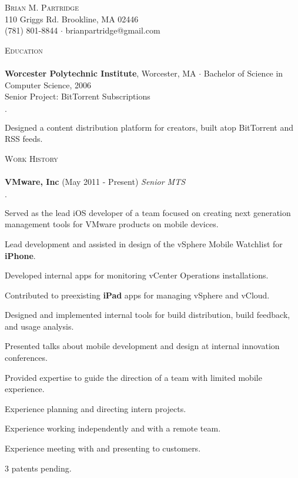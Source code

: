 \documentclass[11pt]{article}
\newcommand{\mydot}{$\cdot$ }
\newcommand{\lineunder}{\vspace*{-8pt} \\ \hspace*{-18pt} \hrulefill \\}
\newcommand{\header}[1]{{\hspace*{-15pt}\vspace*{6pt} \textsc{#1}} \vspace*{-6pt} \lineunder}
\newcommand{\contact}[3]{\vspace*{-8pt}\begin{center}{\LARGE \scshape {#1}}\\#2 \\ #3\end{center}\vspace*{-8pt}}
\newcommand{\school}[3]{\textbf{#1}{#2} \mydot #3 \\}
\newcommand{\seniorproject}[2]{Senior Project: #1\\ #2  }
\newcommand{\employer}[3]{\textbf{#1} (#2) \emph{#3}\\  }
\newenvironment{achievements}{\begin{list}{\mydot}{\topsep 0pt \itemsep -2pt}}{\vspace*{4pt}\end{list}}
\begin{document}
\small
\smallskip
\vspace*{-44pt}


\contact{Brian M. Partridge}
{110 Griggs Rd. Brookline, MA 02446}
{
(781) 801-8844
\mydot brianpartridge@gmail.com 
}


\header{Education}
\school{Worcester Polytechnic Institute}{, Worcester, MA}{Bachelor of Science in Computer Science, 2006}

\seniorproject{BitTorrent Subscriptions}{
\begin{achievements}
  \item Designed a content distribution platform for creators, built atop BitTorrent and RSS feeds.
\end{achievements}
}


\header{Work History}
\employer{VMware, Inc}{May 2011 - Present}{Senior MTS}
\begin{achievements}
  \item Served as the lead iOS developer of a team focused on creating next generation management tools for VMware products on mobile devices.
  \item Lead development and assisted in design of the vSphere Mobile Watchlist for \textbf{iPhone}.
  \item Developed internal apps for monitoring vCenter Operations installations.
  \item Contributed to preexisting \textbf{iPad} apps for managing vSphere and vCloud.
  \item Designed and implemented internal tools for build distribution, build feedback, and usage analysis.
  \item Presented talks about mobile development and design at internal innovation conferences.
  \item Provided expertise to guide the direction of a team with limited mobile experience.
  \item Experience planning and directing intern projects.
  \item Experience working independently and with a remote team.
  \item Experience meeting with and presenting to customers.
  \item 3 patents pending.
\end{achievements}
  
\end{document}
